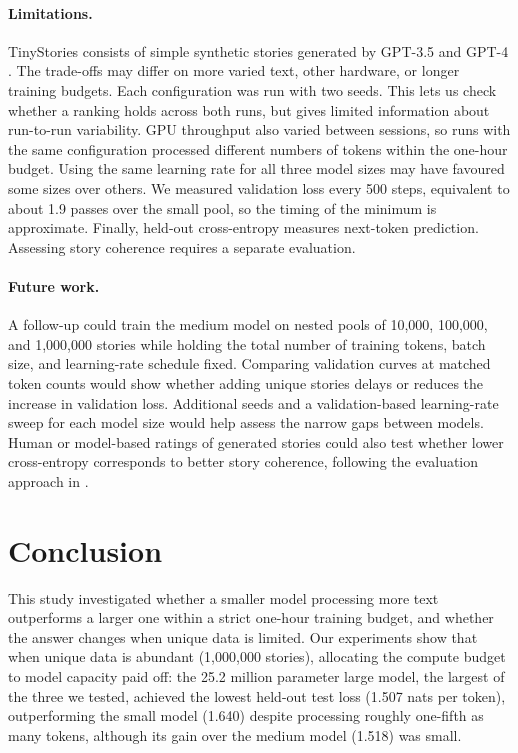 \documentclass[12pt]{article}
\begin{document}
\paragraph{Limitations.}
TinyStories consists of simple synthetic stories generated by
GPT-3.5 and GPT-4 \citep{eldan2023tinystories}. The trade-offs
may differ on more varied text, other hardware, or longer
training budgets. Each configuration was run with two seeds.
This lets us check whether a ranking holds across both runs,
but gives limited information about run-to-run variability.
GPU throughput also varied between sessions, so runs with the
same configuration processed different numbers of tokens within
the one-hour budget. Using the same learning rate for all three
model sizes may have favoured some sizes over others. We measured
validation loss every 500 steps, equivalent to about 1.9 passes
over the small pool, so the timing of the minimum is approximate.
Finally, held-out cross-entropy measures next-token prediction.
Assessing story coherence requires a separate evaluation.

\paragraph{Future work.}
A follow-up could train the medium model on nested pools of
10,000, 100,000, and 1,000,000 stories while holding the total
number of training tokens, batch size, and learning-rate schedule
fixed. Comparing validation curves at matched token counts
would show whether adding unique stories delays or reduces the
increase in validation loss. Additional seeds and a validation-based
learning-rate sweep for each model size would help assess the
narrow gaps between models. Human or model-based ratings of
generated stories could also test whether lower cross-entropy
corresponds to better story coherence, following the evaluation
approach in \citet{eldan2023tinystories}.

\section{Conclusion}
\label{sec:conclusion}

This study investigated whether a smaller model processing more text outperforms a larger one within a strict one-hour training budget, and whether the answer changes when unique data is limited. Our experiments show that when unique data is abundant (1,000,000 stories), allocating the compute budget to model capacity paid off: the 25.2 million parameter large model, the largest of the three we tested, achieved the lowest held-out test loss (1.507 nats per token), outperforming the small model (1.640) despite processing roughly one-fifth as many tokens, although its gain over the medium model (1.518) was small.
\end{document}

